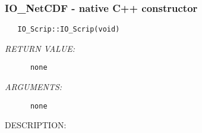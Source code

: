  
\setlength{\oldparskip}{\parskip}
\setlength{\parskip}{1.5ex}
\setlength{\oldparindent}{\parindent}
\setlength{\parindent}{0pt}
\setlength{\oldbaselineskip}{\baselineskip}
\setlength{\baselineskip}{11pt}
 
\def\bv{\begin{verbatim}}
\def\ev{\end{verbatim}}
\def\be{\begin{equation}}
\def\ee{\end{equation}}
\def\bea{\begin{eqnarray}}
\def\eea{\end{eqnarray}}
\def\bi{\begin{itemize}}
\def\ei{\end{itemize}}
\def\bn{\begin{enumerate}}
\def\en{\end{enumerate}}
\def\bd{\begin{description}}
\def\ed{\end{description}}
\def\({\left (}
\def\){\right )}
\def\[{\left [}
\def\]{\right ]}
\def\<{\left  \langle}
\def\>{\right \rangle}
\def\cI{{\cal I}}
\def\diag{\mathop{\rm diag}}
\def\tr{\mathop{\rm tr}}


 
\subsubsection [IO\_NetCDF] {IO\_NetCDF - native C++ constructor}


  
\begin{verbatim}   IO_Scrip::IO_Scrip(void)\end{verbatim}{\em RETURN VALUE:}
\begin{verbatim}      none\end{verbatim}{\em ARGUMENTS:}
\begin{verbatim}      none\end{verbatim}
{\sf DESCRIPTION:\\ }


